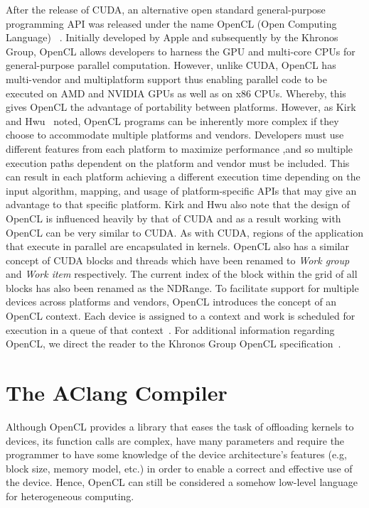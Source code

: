 \documentclass[Ingles]{ic-tese-v1}
\newcommand{\tit}[1]{{\textit{#1}}}
\begin{document}
After the release of CUDA, an alternative open standard general-purpose programming
API was released under the name OpenCL (Open Computing Language) ~\cite{Kirk:2012}.
Initially developed by Apple and subsequently by the Khronos Group, OpenCL allows
developers to harness the GPU and multi-core CPUs for general-purpose parallel
computation. However, unlike CUDA, OpenCL has multi-vendor and multiplatform
support thus enabling parallel code to be executed on AMD and NVIDIA GPUs
as well as on x86 CPUs. Whereby, this gives OpenCL the advantage of portability between
platforms. However, as Kirk and Hwu~\cite{Kirk:2012} noted, OpenCL programs
can be inherently more complex if they choose to accommodate multiple platforms and vendors.
Developers must use different features from each platform to maximize performance
,and so multiple execution paths dependent on the platform and vendor must be
included. This can result in each platform achieving a different execution time
depending on the input algorithm, mapping, and usage of platform-specific APIs
that may give an advantage to that specific platform. Kirk and Hwu also note
that the design of OpenCL is influenced heavily by that of CUDA and as a result
working with OpenCL can be very similar to CUDA. As with CUDA, regions of
the application that execute in parallel are encapsulated in kernels. OpenCL also
has a similar concept of CUDA blocks and threads which have been renamed to
\tit{Work group} and \tit{Work item} respectively. The current index of the block within the
grid of all blocks has also been renamed as the NDRange. To facilitate support for
multiple devices across platforms and vendors, OpenCL introduces the concept of
an OpenCL context. Each device is assigned to a context and work is scheduled
for execution in a queue of that context~\cite{Kirk:2012}. For additional information
regarding OpenCL, we direct the reader to the Khronos Group OpenCL
specification~\cite{opencl}.

\section{The AClang Compiler}
\label{sec:AClang}

Although OpenCL provides  a library that eases the  task of offloading
kernels  to  devices,  its  function  calls  are  complex,  have  many
parameters and  require the programmer  to have some knowledge  of the
device architecture's  features (e.g, block size,  memory model, etc.)
in order to enable a correct and effective use of the device. Hence,
OpenCL  can  still  be  considered a  somehow  low-level  language  for
heterogeneous computing.
\end{document}
